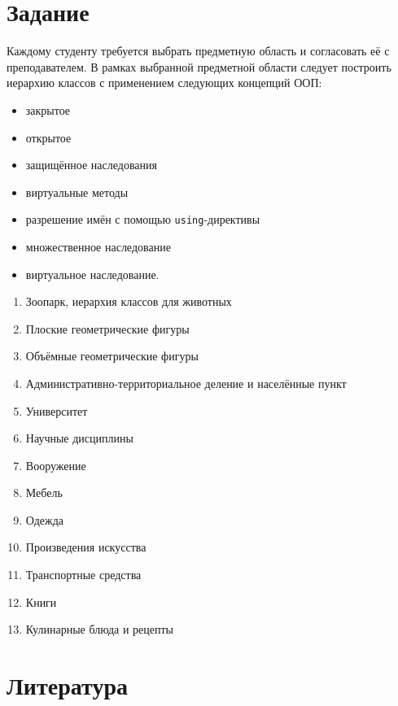 \documentclass[a4paper,12pt]{article}
\begin{document}


\tableofcontents

\section{Задание}
\label{sec:Task}

Каждому студенту требуется выбрать предметную область и согласовать её
с преподавателем. В рамках выбранной предметной области следует
построить иерархию классов с применением следующих концепций ООП:

\begin{itemize}
\item закрытое
\item открытое
\item защищённое наследования
\item виртуальные методы
\item разрешение имён с помощью \lstinline|using|-директивы
\item множественное наследование
\item виртуальное наследование.
\end{itemize}

\begin{enumerate}
\item Зоопарк, иерархия классов для животных
\item Плоские геометрические фигуры
\item Объёмные геометрические фигуры
\item Административно-территориальное деление и населённые пункт
\item Университет
\item Научные дисциплины
\item Вооружение
\item Мебель
\item Одежда
\item Произведения искусства
\item Транспортные средства
\item Книги
\item Кулинарные блюда и рецепты
\end{enumerate}

\section{Литература}
\label{sec:Literature}
\end{document}
